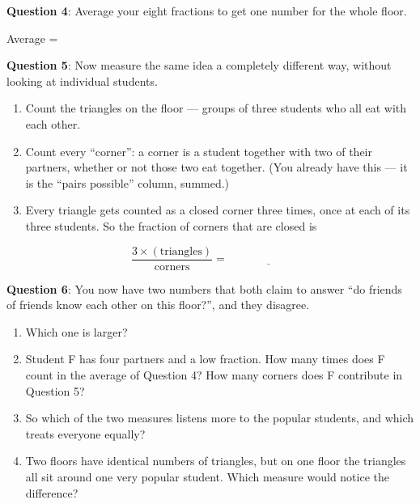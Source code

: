 \documentclass[a4paper, 14pt]{extarticle}
\begin{document}
{\bf Question 4}:
Average your eight fractions to get one number for the whole floor.

Average = \underline{\hspace{4cm}}

\vspace{2em}

{\bf Question 5}:
Now measure the same idea a completely different way, without looking at
individual students.

\begin{enumerate}
    \item Count the triangles on the floor --- groups of three students who all
          eat with each other. \underline{\hspace{2cm}}
    \item Count every ``corner'': a corner is a student together with two of
          their partners, whether or not those two eat together. (You already
          have this --- it is the ``pairs possible'' column, summed.)
          \underline{\hspace{2cm}}
    \item Every triangle gets counted as a closed corner three times, once at
          each of its three students. So the fraction of corners that are
          closed is

          \[
          \frac{3 \times (\text{triangles})}{\text{corners}} =
          \underline{\hspace{3cm}}
          \]
\end{enumerate}

{\bf Question 6}:
You now have two numbers that both claim to answer ``do friends of friends know
each other on this floor?'', and they disagree.

\begin{enumerate}
    \item Which one is larger? \underline{\hspace{2cm}}
    \item Student F has four partners and a low fraction. How many times does F
          count in the average of Question 4? \underline{\hspace{2cm}}
          How many corners does F contribute in Question 5?
          \underline{\hspace{2cm}}
    \item So which of the two measures listens more to the popular students,
          and which treats everyone equally?

    \underline{\hspace{\textwidth}}

    \item Two floors have identical numbers of triangles, but on one floor the
          triangles all sit around one very popular student. Which measure
          would notice the difference?

    \underline{\hspace{\textwidth}}
\end{enumerate}
\end{document}
